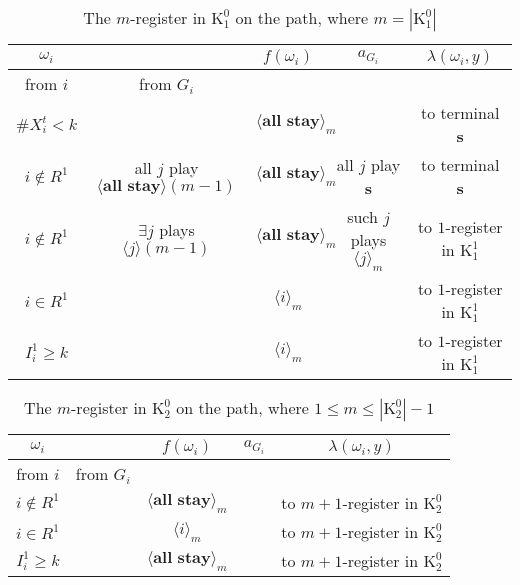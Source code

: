 \documentclass[12pt,letter]{article}
\newcommand{\Kappa}{\mathrm{K}}
\theoremstyle{definition}
\theoremstyle{remark}
\theoremstyle{claim}
\begin{document}
\begin{table}[!htbp]
\caption{The $m$-register in $\Kappa^0_{1}$ on the path, where $m=|\Kappa^0_1|$}
\begin{center}
\begin{tabular}{c c | c | c | c}
$\omega_i$ 	 & 	   &	$f(\omega_i)$  &	$a_{G_i}$ & $\lambda(\omega_i,y)$ \\
\hline
\hline
from $i$ 	 & from $G_i$	  & 	&	 & \\
\hline
$\# X^t_i<k$  	& 	& $\langle \textbf{all stay} \rangle_m$	&     & to terminal \textbf{s}\\
$i\notin R^1$  	& all $j$ play $\langle \textbf{all stay} \rangle(m-1)$ & $\langle \textbf{all stay} \rangle_m$	 & all $j$ play \textbf{s} & to terminal \textbf{s}\\
$i\notin R^1$  	& $\exists j$ plays $\langle j \rangle(m-1)$ & $\langle \textbf{all stay} \rangle_m$	& such $j$ plays $\langle j \rangle_m$  & to $1$-register in $\Kappa^1_{1}$\\
$i\in R^1$  	& 	& $\langle i \rangle_m$	&& to $1$-register in $\Kappa^1_{1}$ \\
$I^1_i\geq k$  	& 	& $\langle i \rangle_m$ &	& to $1$-register in $\Kappa^1_{1}$ \\
\hline
\end{tabular}
\end{center}
\end{table}

\begin{table}[!htbp]
\caption{The $m$-register in $\Kappa^0_{2}$ on the path, where $1\leq m \leq |\Kappa^0_2|-1$}
\begin{center}
\begin{tabular}{c c | c | c | c}
$\omega_i$ 	 & 	   &	$f(\omega_i)$  &	$a_{G_i}$ & $\lambda(\omega_i,y)$ \\
\hline
\hline
from $i$ 	 & from $G_i$	  & 	&	 & \\
\hline
$i\notin R^1$  	& & $\langle \textbf{all stay} \rangle_m$	&    & to $m+1$-register in $\Kappa^0_{2}$\\
$i\in R^1$  	& 	& $\langle i \rangle_m$	& 	&to $m+1$-register in $\Kappa^0_{2}$\\
$I^1_i\geq k$  	& 	& $\langle \textbf{all stay} \rangle_m$	&	& to $m+1$-register in $\Kappa^0_{2}$\\
\hline
\end{tabular}
\end{center}
\end{table}
\end{document}
